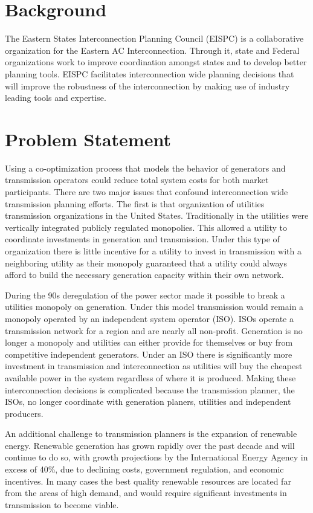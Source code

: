 \documentclass[12pt,letterpaper]{article}
\theoremstyle{definition}
\begin{document}
\newpage

\section{Background} 
The Eastern States Interconnection Planning Council (EISPC) is a collaborative organization for the Eastern AC Interconnection. Through it, state and Federal organizations work to improve coordination  amongst states and to develop better planning tools. EISPC facilitates interconnection wide planning decisions that will improve the robustness of the interconnection by making use of industry leading tools and expertise. 

\section{Problem Statement}
Using a co-optimization process that models the behavior of generators and transmission operators could reduce total system costs for both market participants.
There are two major issues that confound interconnection wide transmission planning efforts. The first is that organization of utilities transmission organizations in the United States. Traditionally in the utilities were vertically integrated publicly regulated monopolies. This allowed a utility to coordinate investments in generation and transmission. Under this type of organization there is little incentive for a utility to invest in transmission with a neighboring utility as their monopoly guaranteed that a utility could always afford to build the necessary generation capacity within their own network.

During the 90s deregulation of the power sector made it possible to break a utilities monopoly on generation. Under this model transmission would remain a monopoly operated by an independent system operator (ISO). ISOs operate a transmission network for a region and are nearly all non-profit. Generation is no longer a monopoly and utilities can either provide for themselves or buy from competitive independent generators. Under an ISO there is significantly more investment in transmission and interconnection as utilities will buy the cheapest available power in the system regardless of where it is produced. Making these interconnection decisions is complicated because the transmission planner, the ISOs, no longer coordinate with generation planers, utilities and independent producers.

An additional challenge to transmission planners is the expansion of renewable energy. Renewable generation has grown rapidly over the past decade and will continue to do so, with growth projections by the International Energy Agency in excess of 40\%, due to declining costs, government regulation, and economic incentives. \cite{IEA} In many cases the best quality renewable resources are located far from the areas of high demand, and would require significant investments in transmission to become viable. 
\end{document}
